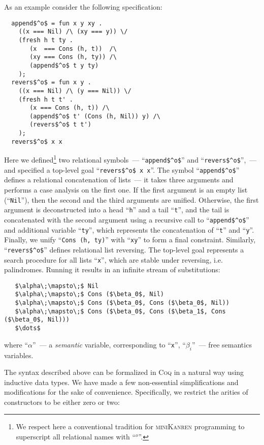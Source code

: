 As an example consider the following specification:

\begin{lstlisting}
  append$^o$ = fun x y xy .
    ((x === Nil) /\ (xy === y)) \/
    (fresh h t ty .
       (x  === Cons (h, t))  /\
       (xy === Cons (h, ty)) /\
       (append$^o$ t y ty)
    );
  revers$^o$ = fun x y .
    ((x === Nil) /\ (y === Nil)) \/
    (fresh h t t' .
       (x === Cons (h, t)) /\
       (append$^o$ t' (Cons (h, Nil)) y) /\
       (revers$^o$ t t') 
    );
  revers$^o$ x x
\end{lstlisting}

Here we defined\footnote{We respect here a conventional tradition for \textsc{miniKanren} programming to superscript all relational names with ``$^o$''.}
two relational symbols~--- ``\lstinline|append$^o$|'' and ``\lstinline|revers$^o$|'',~--- and specified a top-level goal ``\lstinline|revers$^o$ x x|''.
The symbol ``\lstinline|append$^o$|'' defines a relational concatenation of lists~--- it takes three arguments and performs a case analysis on the first one. If the
first argument is an empty list (``\lstinline|Nil|''), then the second and the third arguments are unified. Otherwise, the first argument is deconstructed into a head ``\lstinline|h|''
and a tail ``\lstinline|t|'', and the tail is concatenated with the second argument using a recursive call to ``\lstinline|append$^o$|'' and additional variable ``\lstinline|ty|'', which
represents the concatenation of ``\lstinline|t|'' and ``\lstinline|y|''. Finally, we unify ``\lstinline|Cons (h, ty)|'' with ``\lstinline|xy|'' to form a final constraint. Similarly,
``\lstinline|revers$^o$|'' defines relational list reversing. The top-level goal represents a search procedure for all lists ``\lstinline|x|'', which are stable under reversing, i.e.
palindromes. Running it results in an infinite stream of substitutions:

\begin{lstlisting}
   $\alpha\;\mapsto\;$ Nil
   $\alpha\;\mapsto\;$ Cons ($\beta_0$, Nil)
   $\alpha\;\mapsto\;$ Cons ($\beta_0$, Cons ($\beta_0$, Nil))
   $\alpha\;\mapsto\;$ Cons ($\beta_0$, Cons ($\beta_1$, Cons ($\beta_0$, Nil)))
   $\dots$
\end{lstlisting}

where ``$\alpha$''~--- a \emph{semantic} variable, corresponding to ``\lstinline|x|'', ``$\beta_i$''~--- free semantics variables.

The syntax described above can be formalized in \textsc{Coq} in a natural way using inductive data types. We have made a few non-essential simplifications and modifications for the sake of convenience.
Specifically, we restrict the arities of constructors to be either zero or two:

